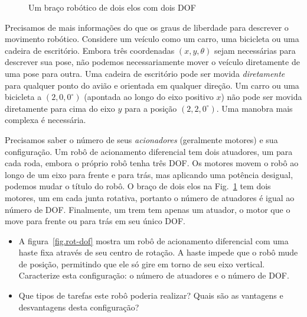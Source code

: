 \begin{figure}
\begin{center}
\end{center}
\caption{Um braço robótico de dois elos com dois DOF}\label{fig.two-link}
\end{figure}

Precisamos de mais informações do que os graus de liberdade para descrever o movimento robótico. Considere um veículo como um carro, uma bicicleta ou uma cadeira de escritório. Embora três coordenadas $(x,y,\theta)$ sejam necessárias para descrever sua pose, não podemos necessariamente mover o veículo diretamente de uma pose para outra. Uma cadeira de escritório pode ser movida \emph{diretamente} para qualquer ponto do avião e orientada em qualquer direção. Um carro ou uma bicicleta a $(2,0,0^\circ)$ (apontada ao longo do eixo positivo $x$) não pode ser movida diretamente para cima do eixo $y$ para a posição $(2,2,0^\circ)$. Uma manobra mais complexa é necessária.

Precisamos saber o número de seus \emph{acionadores} (geralmente motores) e sua configuração. Um robô de acionamento diferencial tem dois atuadores, um para cada roda, embora o próprio robô tenha três DOF. Os motores movem o robô ao longo de um eixo para frente e para trás, mas aplicando uma potência desigual, podemos mudar o título do robô. O braço de dois elos na Fig.~\ref{fig.two-link} tem dois motores, um em cada junta rotativa, portanto o número de atuadores é igual ao número de DOF. Finalmente, um trem tem apenas um atuador, o motor que o move para frente ou para trás em seu único DOF.

\begin{framed}
\begin{itemize}
\item A figura~\ref{fig.rot-dof} mostra um robô de acionamento diferencial com uma haste fixa através de seu centro de rotação. A haste impede que o robô mude de posição, permitindo que ele só gire em torno de seu eixo vertical. Caracterize esta configuração: o número de atuadores e o número de DOF.
\item Que tipos de tarefas este robô poderia realizar? Quais são as vantagens e desvantagens desta configuração?
\end{itemize}
\end{framed}

